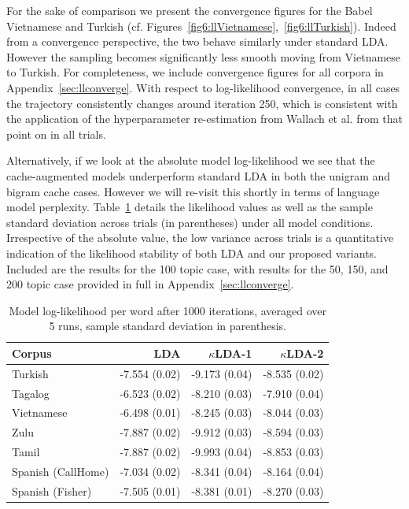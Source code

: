 For the sake of comparison we present the convergence figures for the Babel Vietnamese and Turkish (cf. Figures~\ref{fig6:llVietnamese},~\ref{fig6:llTurkish}).  Indeed from a convergence perspective, the two behave similarly under standard LDA.  However the sampling becomes significantly less smooth moving from Vietnamese to Turkish.  For completeness, we include convergence figures for all corpora in Appendix~\ref{sec:llconverge}.  With respect to log-likelihood convergence, in all cases the trajectory consistently changes around iteration 250, which is consistent with the application of the hyperparameter re-estimation from Wallach et al.\cite{wallach2009} from that point on in all trials.

Alternatively, if we look at the absolute model log-likelihood we see that the cache-augmented models underperform standard LDA in both the unigram and bigram cache cases.  However we will re-visit this shortly in terms of language model perplexity.  Table~\ref{fig6:llstats} details the likelihood values as well as the sample standard deviation across trials (in parentheses) under all model conditions.  Irrespective of the absolute value, the low variance across trials is a quantitative indication of the likelihood stability of both LDA and our proposed variants.  Included are the results for the 100 topic case, with results for the 50, 150, and 200 topic case provided in full in Appendix~\ref{sec:llconverge}.

\begin{table}[t]
\begin{center}
   \begin{tabular}{lrrr}\toprule
   \textbf{Corpus} & \textbf{LDA} & \textbf{$\kappa$LDA-1} & \textbf{$\kappa$LDA-2}\\ \midrule
Turkish &  -7.554 (0.02) & -9.173 (0.04) & -8.535 (0.02) \\
Tagalog &  -6.523 (0.02) & -8.210 (0.03) & -7.910 (0.04) \\
Vietnamese & -6.498 (0.01) & -8.245 (0.03) & -8.044 (0.03) \\
Zulu &  -7.887 (0.02) & -9.912 (0.03) & -8.594 (0.03) \\
Tamil &  -7.887 (0.02) & -9.993 (0.04) & -8.853 (0.03) \\
Spanish (CallHome) &  -7.034 (0.02) & -8.341 (0.04) & -8.164 (0.04) \\
Spanish (Fisher) & -7.505 (0.01) & -8.381 (0.01) & -8.270 (0.03) \\
 \bottomrule
  \end{tabular}
\caption[Model log-likelihood per word]{Model log-likelihood per word after 1000 iterations, averaged over 5 runs, sample standard deviation in parenthesis.\label{fig6:llstats}}
\end{center}
\end{table}


